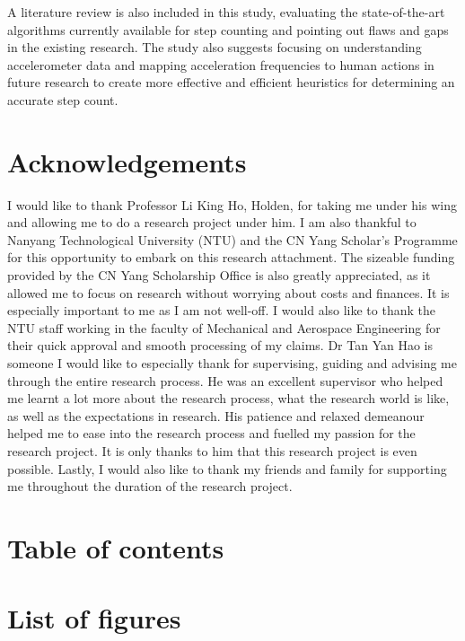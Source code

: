 \documentclass[12pt]{report}
\begin{document}
A literature review is also included in this study,
evaluating the state-of-the-art algorithms currently available
for step counting and pointing out flaws and gaps in the
existing research.
The study also suggests focusing on understanding
accelerometer data and mapping acceleration frequencies to
human actions in future research to create more effective
and efficient heuristics for determining an accurate step count.
\chapter{Acknowledgements}
\label{sec:org0ffcc40}
I would like to thank Professor Li King Ho, Holden, for taking me under
his wing and allowing me to do a research project under him.
I am also thankful to Nanyang Technological University (NTU) and the
CN Yang Scholar's Programme for this opportunity to embark on
this research attachment.
The sizeable funding provided by the CN Yang Scholarship Office
is also greatly appreciated, as it allowed me to focus on research
without worrying about costs and finances.
It is especially important to me as I am not well-off.
I would also like to thank the NTU staff working in the
faculty of Mechanical and Aerospace Engineering for their quick approval
and smooth processing of my claims.
Dr Tan Yan Hao is someone I would like to especially thank for
supervising, guiding and advising me through the entire research process.
He was an excellent supervisor who helped me learnt a lot more
about the research process, what the research world is like,
as well as the expectations in research.
His patience and relaxed demeanour helped me to ease into the
research process and fuelled my passion for the research project.
It is only thanks to him that this research project is even possible.
Lastly, I would also like to thank my friends
and family for supporting me throughout the duration of the research project.
\chapter{Table of contents}
\label{sec:orge61c22f}
\setcounter{tocdepth}{2}
\tableofcontents
\chapter{List of figures}
\label{sec:org7a14fcf}
\listoffigures
\clearpage


\renewcommand{\chapter}{\nostarchapter}
\end{document}
